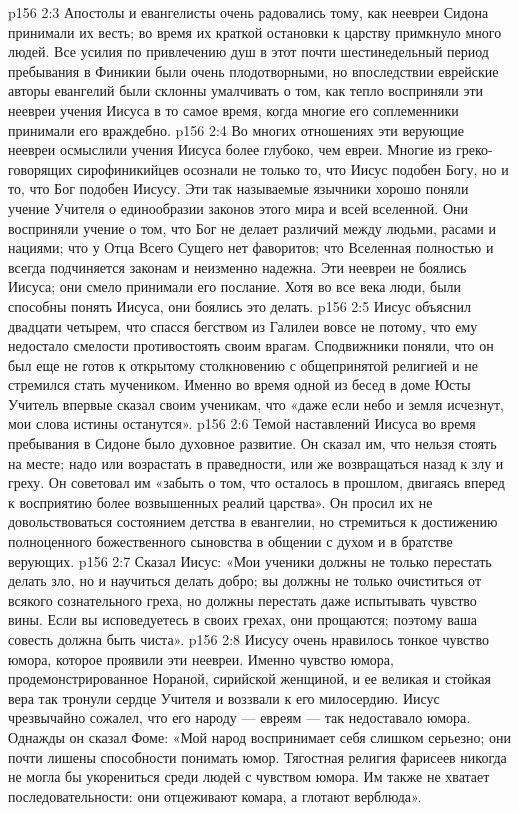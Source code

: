 \vs p156 2:3 Апостолы и евангелисты очень радовались тому, как неевреи Сидона принимали их весть; во время их краткой остановки к царству примкнуло много людей. Все усилия по привлечению душ в этот почти шестинедельный период пребывания в Финикии были очень плодотворными, но впоследствии еврейские авторы евангелий были склонны умалчивать о том, как тепло восприняли эти неевреи учения Иисуса в то самое время, когда многие его соплеменники принимали его враждебно.
\vs p156 2:4 Во многих отношениях эти верующие неевреи осмыслили учения Иисуса более глубоко, чем евреи. Многие из греко\hyp{}говорящих сирофиникийцев осознали не только то, что Иисус подобен Богу, но и то, что Бог подобен Иисусу. Эти так называемые язычники хорошо поняли учение Учителя о единообразии законов этого мира и всей вселенной. Они восприняли учение о том, что Бог не делает различий между людьми, расами и нациями; что у Отца Всего Сущего нет фаворитов; что Вселенная полностью и всегда подчиняется законам и неизменно надежна. Эти неевреи не боялись Иисуса; они смело принимали его послание. Хотя во все века люди, были способны понять Иисуса, они боялись это делать.
\vs p156 2:5 \pc Иисус объяснил двадцати четырем, что спасся бегством из Галилеи вовсе не потому, что ему недостало смелости противостоять своим врагам. Сподвижники поняли, что он был еще не готов к открытому столкновению с общепринятой религией и не стремился стать мучеником. Именно во время одной из бесед в доме Юсты Учитель впервые сказал своим ученикам, что «даже если небо и земля исчезнут, мои слова истины останутся».
\vs p156 2:6 \pc Темой наставлений Иисуса во время пребывания в Сидоне было духовное развитие. Он сказал им, что нельзя стоять на месте; надо или возрастать в праведности, или же возвращаться назад к злу и греху. Он советовал им «забыть о том, что осталось в прошлом, двигаясь вперед к восприятию более возвышенных реалий царства». Он просил их не довольствоваться состоянием детства в евангелии, но стремиться к достижению полноценного божественного сыновства в общении с духом и в братстве верующих.
\vs p156 2:7 Сказал Иисус: «Мои ученики должны не только перестать делать зло, но и научиться делать добро; вы должны не только очиститься от всякого сознательного греха, но должны перестать даже испытывать чувство вины. Если вы исповедуетесь в своих грехах, они прощаются; поэтому ваша совесть должна быть чиста».
\vs p156 2:8 Иисусу очень нравилось тонкое чувство юмора, которое проявили эти неевреи. Именно чувство юмора, продемонстрированное Нораной, сирийской женщиной, и ее великая и стойкая вера так тронули сердце Учителя и воззвали к его милосердию. Иисус чрезвычайно сожалел, что его народу --- евреям --- так недоставало юмора. Однажды он сказал Фоме: «Мой народ воспринимает себя слишком серьезно; они почти лишены способности понимать юмор. Тягостная религия фарисеев никогда не могла бы укорениться среди людей с чувством юмора. Им также не хватает последовательности: они отцеживают комара, а глотают верблюда».
